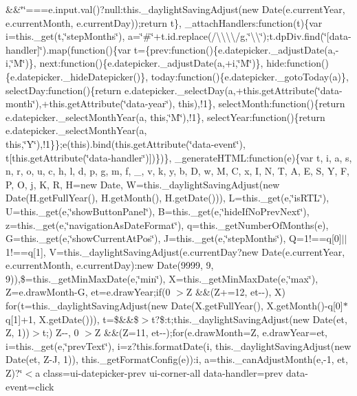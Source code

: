 \begin{DoxyCompactItemize}
\&\&\char`\"{}\char`\"{}===e.\+input.\+val()?null\+:this.\+\_\+daylight\+Saving\+Adjust(new Date(e.\+current\+Year, e.\+current\+Month, e.\+current\+Day));return t\}, \+\_\+attach\+Handlers\+:function(t)\{var i=this.\+\_\+get(t,\char`\"{}step\+Months\char`\"{}), a=\char`\"{}\#\char`\"{}+t.\+id.\+replace(/\textbackslash{}\textbackslash{}\textbackslash{}\textbackslash{}/g,\char`\"{}\textbackslash{}\textbackslash{}\char`\"{});t.\+dp\+Div.\+find(\char`\"{}\mbox{[}data-\/handler\mbox{]}\char`\"{}).\+map(function()\{var t=\{prev\+:function()\{e.\+datepicker.\+\_\+adjust\+Date(a,-\/i,\char`\"{}\+M\char`\"{})\}, next\+:function()\{e.\+datepicker.\+\_\+adjust\+Date(a,+i,\char`\"{}\+M\char`\"{})\}, hide\+:function()\{e.\+datepicker.\+\_\+hide\+Datepicker()\}, today\+:function()\{e.\+datepicker.\+\_\+goto\+Today(a)\}, select\+Day\+:function()\{return e.\+datepicker.\+\_\+select\+Day(a,+this.\+get\+Attribute(\char`\"{}data-\/month\char`\"{}),+this.\+get\+Attribute(\char`\"{}data-\/year\char`\"{}), this),!1\}, select\+Month\+:function()\{return e.\+datepicker.\+\_\+select\+Month\+Year(a, this,\char`\"{}\+M\char`\"{}),!1\}, select\+Year\+:function()\{return e.\+datepicker.\+\_\+select\+Month\+Year(a, this,\char`\"{}\+Y\char`\"{}),!1\}\};e(this).\+bind(this.\+get\+Attribute(\char`\"{}data-\/event\char`\"{}), t\mbox{[}this.\+get\+Attribute(\char`\"{}data-\/handler\char`\"{})\mbox{]})\})\}, \+\_\+generate\+H\+T\+M\+L\+:function(e)\{var t, i, a, s, n, r, o, u, c, h, l, d, p, g, m, f, \+\_\+, v, k, y, b, D, w, M, C, x, I, N, T, A, E, S, Y, F, P, O, j, K, R, H=new Date, W=this.\+\_\+daylight\+Saving\+Adjust(new Date(\+H.\+get\+Full\+Year(), H.\+get\+Month(), H.\+get\+Date())), L=this.\+\_\+get(e,\char`\"{}is\+R\+T\+L\char`\"{}), U=this.\+\_\+get(e,\char`\"{}show\+Button\+Panel\char`\"{}), B=this.\+\_\+get(e,\char`\"{}hide\+If\+No\+Prev\+Next\char`\"{}), z=this.\+\_\+get(e,\char`\"{}navigation\+As\+Date\+Format\char`\"{}), q=this.\+\_\+get\+Number\+Of\+Months(e), G=this.\+\_\+get(e,\char`\"{}show\+Current\+At\+Pos\char`\"{}), J=this.\+\_\+get(e,\char`\"{}step\+Months\char`\"{}), Q=1!==q\mbox{[}0\mbox{]}$\vert$$\vert$1!==q\mbox{[}1\mbox{]}, V=this.\+\_\+daylight\+Saving\+Adjust(e.\+current\+Day?new Date(e.\+current\+Year, e.\+current\+Month, e.\+current\+Day)\+:new Date(9999, 9, 9)),\$=this.\+\_\+get\+Min\+Max\+Date(e,\char`\"{}min\char`\"{}), X=this.\+\_\+get\+Min\+Max\+Date(e,\char`\"{}max\char`\"{}), Z=e.\+draw\+Month-\/\+G, et=e.\+draw\+Year;if(0 $>$\+Z \&\&(\+Z+=12, et-\/-\/), X) for(t=this.\+\_\+daylight\+Saving\+Adjust(new Date(\+X.\+get\+Full\+Year(), X.\+get\+Month()-\/q\mbox{[}0\mbox{]}$\ast$q\mbox{[}1\mbox{]}+1, X.\+get\+Date())), t=\$\&\&\$$>$t?\$\+:t;this.\+\_\+daylight\+Saving\+Adjust(new Date(et, Z, 1))$>$t;) Z-\/-\/, 0 $>$\+Z \&\&(\+Z=11, et-\/-\/);for(e.\+draw\+Month=\+Z, e.\+draw\+Year=et, i=this.\+\_\+get(e,\char`\"{}prev\+Text\char`\"{}), i=z?this.\+format\+Date(i, this.\+\_\+daylight\+Saving\+Adjust(new Date(et, Z-\/\+J, 1)), this.\+\_\+get\+Format\+Config(e))\+:i, a=this.\+\_\+can\+Adjust\+Month(e,-\/1, et, Z)?\char`\"{}$<$a class=\textquotesingle{}ui-\/datepicker-\/prev ui-\/corner-\/all\textquotesingle{} data-\/handler=\textquotesingle{}prev\textquotesingle{} data-\/event=\textquotesingle{}click\textquotesingle{} 
\end{DoxyCompactItemize}
